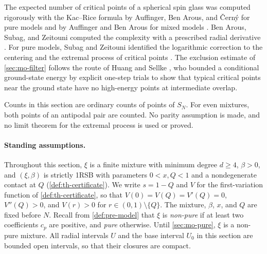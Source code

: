 The expected number of critical points of a spherical spin glass was computed rigorously with the Kac--Rice formula by Auffinger, Ben Arous, and \v{C}ern\'y for pure models \cite{AuffingerBenArousCerny2013} and by Auffinger and Ben Arous for mixed models \cite{AuffingerBenArous2013}. Ben Arous, Subag, and Zeitouni computed the complexity with a prescribed radial derivative \cite[Theorem~5]{BenArousSubagZeitouni2020}. For pure models, Subag and Zeitouni identified the logarithmic correction to the centering and the extremal process of critical points \cite{SubagZeitouni2017}. The exclusion estimate of \cref{sec:mo-filter} follows the route of Huang and Sellke \cite[Section~3.3]{HuangSellke2024}, who bounded a conditional ground-state energy by explicit one-step trials to show that typical critical points near the ground state have no high-energy points at intermediate overlap.

Counts in this section are ordinary counts of points of $S_N$. For even mixtures, both points of an antipodal pair are counted. No parity assumption is made, and no limit theorem for the extremal process is used or proved.

\paragraph{Standing assumptions.}
Throughout this section, $\xi$ is a finite mixture with minimum degree $d\ge4$, $\beta>0$, and $(\xi,\beta)$ is strictly 1RSB with parameters $0<x,Q<1$ and a nondegenerate contact at $Q$ (\cref{def:th-certificate}). We write $s=1-Q$ and $V$ for the first-variation function of \cref{def:th-certificate}, so that $V(0)=V(Q)=V'(Q)=0$, $V''(Q)>0$, and $V(r)>0$ for $r\in(0,1)\setminus\{Q\}$. The mixture, $\beta$, $x$, and $Q$ are fixed before $N$. Recall from \cref{def:pre-model} that $\xi$ is \emph{non-pure} if at least two coefficients $c_p$ are positive, and \emph{pure} otherwise. Until \cref{sec:mo-pure}, $\xi$ is a non-pure mixture. All radial intervals $U$ and the base interval $U_0$ in this section are bounded open intervals, so that their closures are compact.

